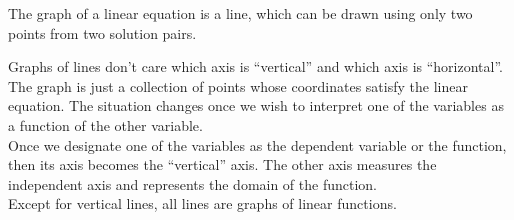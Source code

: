\documentclass{ximera}
\begin{document}
\begin{example}
\begin{image}
\end{image}

The graph of a linear equation is a line, which can be drawn using only two points from two solution pairs.














\end{example}

Graphs of lines don't care which axis is ``vertical'' and which axis is ``horizontal''.  The graph is just a collection of points whose coordinates satisfy the linear equation.  The situation changes once we wish to interpret one of the variables as a function of the other variable. \\




Once we designate one of the variables as the dependent variable or the function, then its axis becomes the ``vertical'' axis.  The other axis measures the independent axis and represents the domain of the function. \\


Except for vertical lines, all lines are graphs of linear functions. \\
\end{document}
